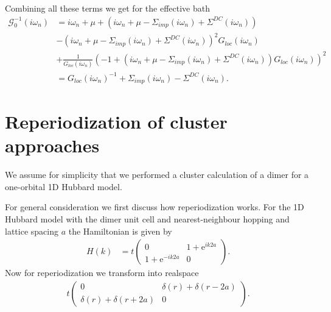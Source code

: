 \documentclass[12pt,a4paper]{scrartcl}
\numberwithin{equation}{section}
\begin{document}
Combining all these terms we get for the effective bath
\begin{align}
 \mathcal{G}_0^{-1}(i\omega_n)
 &= i\omega_n + \mu 
    +\left(i\omega_n + \mu -\Sigma_{imp}(i\omega_n) + \Sigma^{DC}(i\omega_n)\right) \nonumber\\
  &  -\left(i\omega_n + \mu -\Sigma_{imp}(i\omega_n) + \Sigma^{DC}(i\omega_n)\right)^2 G_{loc}(i\omega_n) \nonumber\\
  & + \frac{1}{G_{loc}(i\omega_n)}
   \left( -1 + \left(i\omega_n + \mu -\Sigma_{imp}(i\omega_n) + \Sigma^{DC}(i\omega_n)\right) 
         G_{loc}(i\omega_n) \right)^2 \\
%
&= G_{loc}(i\omega_n)^{-1} + \Sigma_{imp}(i\omega_n) - \Sigma^{DC}(i\omega_n).
\end{align}










\section{Reperiodization of cluster approaches}

We assume for simplicity that we performed a
cluster calculation of a dimer for a one-orbital 1D Hubbard model.

For general consideration we first discuss how reperiodization works.
For the 1D Hubbard model with the dimer unit cell and nearest-neighbour hopping
and lattice spacing $a$
the Hamiltonian is given by
\begin{align}
H(k) &=
t \begin{pmatrix}
  0 & 1+\mathrm{e}^{ik2a} \\
  1+\mathrm{e}^{-ik2a} & 0
 \end{pmatrix} .
\end{align}
Now for reperiodization we transform into realspace
\begin{align}t
 \begin{pmatrix}
  0 & \delta(r)+\delta(r-2a) \\
  \delta(r)+\delta(r+2a) & 0
 \end{pmatrix} .
\end{align}
\end{document}
